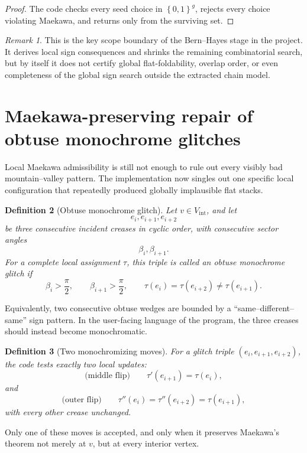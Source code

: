 \documentclass[11pt]{article}
\newtheorem{definition}{Definition}[section]
\theoremstyle{remark}
\newtheorem{remark}[definition]{Remark}
\newcommand{\set}[1]{\left\{ #1 \right\}}
\begin{document}
\begin{proof}
The code checks every seed choice in $\set{0,1}^g$, rejects every choice
violating Maekawa, and returns only from the surviving set.
\end{proof}

\begin{remark}
This is the key scope boundary of the Bern--Hayes stage in the project. It
derives local sign consequences and shrinks the remaining combinatorial search,
but by itself it does not certify global flat-foldability, overlap order, or
even completeness of the global sign search outside the extracted chain model.
\end{remark}

\section{Maekawa-preserving repair of obtuse monochrome glitches}

Local Maekawa admissibility is still not enough to rule out every visibly bad
mountain--valley pattern. The implementation now singles out one specific local
configuration that repeatedly produced globally implausible flat stacks.

\begin{definition}[Obtuse monochrome glitch]
Let $v\in V_{\mathrm{int}}$, and let
\[
e_i,e_{i+1},e_{i+2}
\]
be three consecutive incident creases in cyclic order, with consecutive sector
angles
\[
\beta_i,\beta_{i+1}.
\]
For a complete local assignment $\tau$, this triple is called an
\emph{obtuse monochrome glitch} if
\[
\beta_i>\frac{\pi}{2},
\qquad
\beta_{i+1}>\frac{\pi}{2},
\qquad
\tau(e_i)=\tau(e_{i+2})\neq \tau(e_{i+1}).
\]
\end{definition}

Equivalently, two consecutive obtuse wedges are bounded by a
``same--different--same'' sign pattern. In the user-facing language of the
program, the three creases should instead become monochromatic.

\begin{definition}[Two monochromizing moves]
For a glitch triple $(e_i,e_{i+1},e_{i+2})$, the code tests exactly two local
updates:
\[
\text{(middle flip)}\qquad
\tau'(e_{i+1})=\tau(e_i),
\]
and
\[
\text{(outer flip)}\qquad
\tau''(e_i)=\tau''(e_{i+2})=\tau(e_{i+1}),
\]
with every other crease unchanged.
\end{definition}

Only one of these moves is accepted, and only when it preserves Maekawa's
theorem not merely at $v$, but at every interior vertex.
\end{document}
